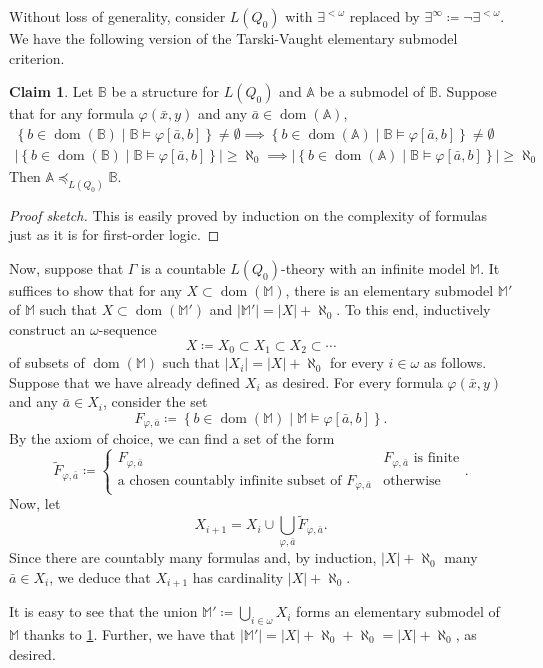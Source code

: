 \documentclass[10pt,letterpaper,cm]{nupset}
\theoremstyle{definition}
\theoremstyle{theorem}
\newtheorem{claim}{Claim}
\theoremstyle{remark}
\newcommand{\A}{\mathbb A}
\newcommand{\M}{\mathbb M}
\newcommand{\B}{\mathbb{B}}
\newcommand{\1}{\mathbb{1}}
\newcommand{\0}{\vec 0}
\DeclareMathOperator{\dom}{dom}
\begin{document}
\begin{solution}
Without loss of generality, consider $L(Q_0)$ with $\exists^{< \omega}$ replaced by $\exists^{\infty} \coloneqq \neg{\exists^{<\omega}}$. We have the following version of the Tarski-Vaught elementary submodel criterion.
\begin{claim}\label{TV}
Let $\B$ be a structure for $L(Q_0)$ and $\A$ be a submodel of $\B$. Suppose that for any formula $\varphi(\bar{x}, y)$ and any $\bar{a}\in \dom(\A)$,
\begin{gather*}
\left\{b\in \dom(\B) \mid \B \models \varphi[\bar{a},b]\right\} \ne \emptyset \implies \left\{b\in \dom(\A) \mid \B \models \varphi[\bar{a},b]\right\} \ne \emptyset 
\\ \left\lvert{\left\{b\in \dom(\B) \mid \B \models \varphi[\bar{a},b]\right\}}\right\rvert \geq \aleph_0 \implies \left\lvert{\left\{b\in \dom(\A) \mid \B \models \varphi[\bar{a},b]\right\}}\right\rvert \geq \aleph_0
\end{gather*} 
Then $\A \preceq_{L(Q_0)} \B$.
\end{claim}
\begin{proof}[Proof sketch]
This is easily proved by induction on the complexity of formulas just as it is for first-order logic.
\end{proof}
Now, suppose that $\Gamma$ is a countable $L(Q_0)$-theory with an infinite model $\M$. It suffices to show that for any $X\subset \dom(\M)$, there is an elementary submodel $\M'$ of $\M$ such that $X\subset \dom(\M')$ and $\left\lvert{\M'}\right\rvert = \left\lvert{X}\right\rvert + \aleph_0$. To this end, inductively construct an $\omega$-sequence
\[
X \coloneqq X_0 \subset X_1 \subset X_2 \subset \cdots
\] of subsets of $\dom(\M)$ such that $\left\lvert{X_i}\right\rvert = \left\lvert{X}\right\rvert + \aleph_0$ for every $i \in \omega$ as follows. Suppose that we have already defined $X_i$ as desired. For every formula  $\varphi(\bar{x}, y)$ and any $\bar{a}\in X_i$, consider the set
\[
F_{\varphi, \bar{a}} \coloneqq \left\{b\in \dom(\M) \mid \M \models \varphi\left[\bar{a}, b\right]\right\} 
.\] By the axiom of choice, we can find a set of the form
\[ \widetilde{F}_{\varphi, \bar{a}} \coloneqq  
 \begin{cases}
 F_{\varphi, \bar{a}}  & F_{\varphi, \bar{a}} \text{ is finite}
 \\ \text{a chosen countably infinite subset of } F_{\varphi, \bar{a}}  & \text{otherwise}
\end{cases}.
\] Now, let 
\[
X_{i+1} = X_i \cup \bigcup_{\varphi, \bar{a}} \widetilde{F}_{\varphi, \bar{a}}.
\] Since there are countably many formulas and, by induction, $ \left\lvert{X}\right\rvert + \aleph_0$ many $\bar{a}\in X_i$, we deduce that $X_{i+1}$ has cardinality $ \left\lvert{X}\right\rvert + \aleph_0$. 

\smallskip 

It is easy to see that the union $\M'\coloneqq \bigcup_{i\in \omega}X_i$ forms an elementary submodel of $\M$ thanks to \cref{TV}. Further, we have that $\left\lvert{\M'}\right\rvert = \left\lvert{X}\right\rvert + \aleph_0 + \aleph_0 =  \left\lvert{X}\right\rvert + \aleph_0$, as desired.
\end{solution}
\end{document}
